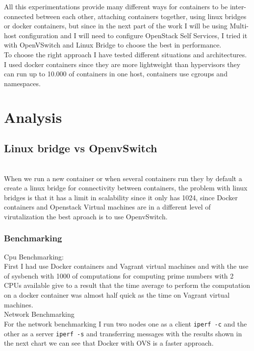 All this experimentations provide many different ways for containers to be inter-connected between each other, attaching containers together, using linux bridges or docker containers, but since in the next part of the work I will be using Multi-host configuration and I will need to configure OpenStack Self Services, I tried it with OpenVSwitch and Linux Bridge to choose the best in performance.\\

To choose the right approach I have tested different situations and architectures.
I used docker containers since they are more lightweight than hypervisors they can run up to 10.000 of containers in one host, containers use cgroups and namespaces.\\

\section{Analysis}
\subsection{Linux bridge vs OpenvSwitch}\\

When we run a new container or when several containers run they by default a create a linux bridge for connectivity between containers, the problem with linux bridges is that it has a limit in scalability since it only has 1024, since Docker containers and Openstack Virtual machines are in a different level of virutalization the best aproach is to use OpenvSwitch.\\

\subsubsection{Benchmarking}

Cpu Benchmarking:\\

First I had use Docker containers and Vagrant virtual machines and with the use of sysbench with  1000 of computations for computing prime numbers with 2 CPUs available give to a result that the time average to perform the computation on a docker container was almost half quick as the time on Vagrant virtual machines.\\

Network Benchmarking \\

For the network benchmarking I run two nodes one as a client \texttt{iperf -c} and the other as a server \texttt{iperf -s} and transferring messages with the results shown in the next chart we can see that Docker with OVS is a faster approach.\\

